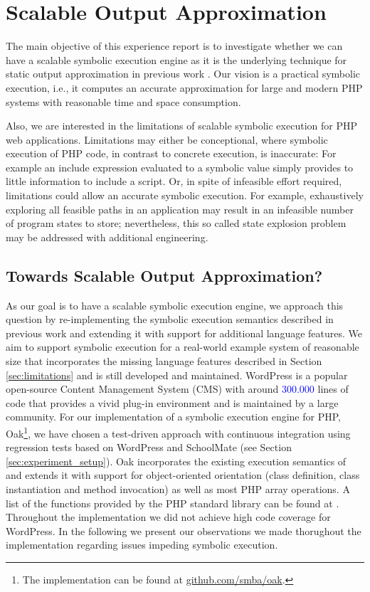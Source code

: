 \documentclass[sigconf]{acmart}
\renewcommand{\sf}[1]{\textsf{#1}}
\begin{document}
\section{Scalable Output Approximation}%
The main objective of this experience report is to investigate whether we can
have a scalable symbolic execution engine as it is the underlying technique for
static output approximation in previous work
\cite{Nguyen:2011:AFH:2190078.2190142,Nguyen:2014:BCG:2635868.2635928,Nguyen:2015:CPS:2786805.2786872,Nguyen:2015:VIS:2819009.2819140}.
Our vision is a practical symbolic execution, i.e., it computes an accurate approximation for large and modern PHP systems with reasonable time and space consumption.

Also, we are interested in the limitations of scalable symbolic execution for
PHP web applications. Limitations may either be conceptional, where symbolic
execution of PHP code, in contrast to concrete execution, is inaccurate: For
example an include expression evaluated to a symbolic value simply provides to
little information to include a script. Or, in spite of infeasible effort
required, limitations could allow an accurate symbolic execution. For example,
exhaustively exploring all feasible paths in an application may result in an
infeasible number of program states to store; nevertheless, this so called
state explosion problem may be addressed with additional engineering.

\subsection{Towards Scalable Output Approximation?}
As our goal is to have a scalable symbolic execution engine, we approach this
question by re-implementing the symbolic execution semantics described in
previous work \cite{Nguyen:2014:BCG:2635868.2635928} and extending it with
support for additional language features. We aim to support symbolic execution
for a real-world example system of reasonable size that incorporates the
missing language features described in Section \ref{sec:limitations} and is
still developed and maintained. \textsf{WordPress} is a popular open-source
Content Management System (CMS) with around \textcolor{blue}{300.000} lines of
code that provides a vivid plug-in environment and is maintained by a large
community.
For our implementation of a symbolic execution engine for PHP,
\textsf{Oak}\footnote{The implementation can be found
at \url{github.com/smba/oak}.}, we have chosen a test-driven approach with
continuous integration using regression tests based on \textsf{WordPress} and \textsf{SchoolMate} (see Section \ref{sec:experiment_setup}). Oak incorporates the existing execution semantics
of \cite{Nguyen:2014:BCG:2635868.2635928} and extends it with support for
object-oriented orientation (class definition, class instantiation and method
invocation) as well as most PHP array operations. A list of the functions
provided by the PHP standard library can be found at \cite{PHP}.
Throughout the implementation we did not achieve high code coverage for
\sf{WordPress}. In the following we present our observations we made thorughout
the implementation regarding issues impeding symbolic execution.
\end{document}
